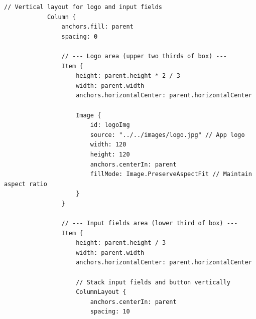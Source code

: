 \documentclass{report}
\begin{document}
\begin{lstlisting}[style=qmlstyle]
            // Vertical layout for logo and input fields
            Column {
                anchors.fill: parent
                spacing: 0

                // --- Logo area (upper two thirds of box) ---
                Item {
                    height: parent.height * 2 / 3
                    width: parent.width
                    anchors.horizontalCenter: parent.horizontalCenter

                    Image {
                        id: logoImg
                        source: "../../images/logo.jpg" // App logo
                        width: 120
                        height: 120
                        anchors.centerIn: parent
                        fillMode: Image.PreserveAspectFit // Maintain aspect ratio
                    }
                }

                // --- Input fields area (lower third of box) ---
                Item {
                    height: parent.height / 3
                    width: parent.width
                    anchors.horizontalCenter: parent.horizontalCenter

                    // Stack input fields and button vertically
                    ColumnLayout {
                        anchors.centerIn: parent
                        spacing: 10


\end{lstlisting}
\end{document}
